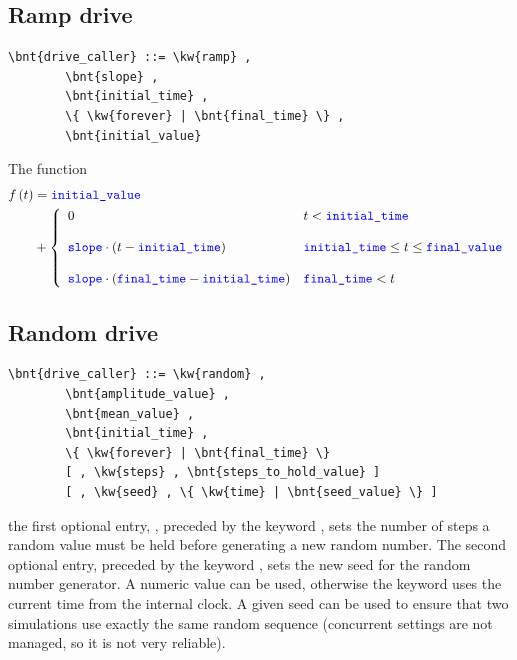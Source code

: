 \subsection{Ramp drive}
\begin{Verbatim}[commandchars=\\\{\}]
    \bnt{drive_caller} ::= \kw{ramp} ,
        \bnt{slope} , 
        \bnt{initial_time} ,
        \{ \kw{forever} | \bnt{final_time} \} ,
        \bnt{initial_value}
\end{Verbatim}
The function
\begin{align}
	f\plbr{t} &= \nt{initial\_value} \nonumber \\
	&+ \lcubr{\matr{ll}{
		0
			& t < \nt{initial\_time} \\
		\\
		\nt{slope} \cdot \plbr{t - \nt{initial\_time}}
			& \nt{initial\_time} \le t \le \nt{final\_value} \\
		\\
		\nt{slope} \cdot \plbr{\nt{final\_time} - \nt{initial\_time}}
			& \nt{final\_time} < t
	}}
\end{align}

\subsection{Random drive}
\begin{Verbatim}[commandchars=\\\{\}]
    \bnt{drive_caller} ::= \kw{random} ,
        \bnt{amplitude_value} ,
        \bnt{mean_value} ,
        \bnt{initial_time} ,
        \{ \kw{forever} | \bnt{final_time} \}
        [ , \kw{steps} , \bnt{steps_to_hold_value} ]
        [ , \kw{seed} , \{ \kw{time} | \bnt{seed_value} \} ]
\end{Verbatim}
the first optional entry, ,
preceded by the keyword , sets the
number of steps a random value must be held before generating a new
random number.
The second optional entry, preceded by the keyword
, sets the new seed for the random number generator.
A numeric  value can be used,
otherwise the keyword  uses the current time from
the internal clock.
A given seed can be used to ensure that two
simulations use exactly the same random sequence (concurrent settings 
are not managed, so it is not very reliable).

